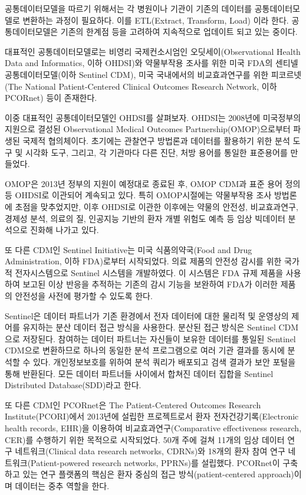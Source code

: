 \documentclass[]{book}
\begin{document}
공통데이터모델을 따르기 위해서는 각 병원이나 기관이 기존의 데이터를 공통데이터모델로 변환하는 과정이 필요하다. 이를 ETL(Extract, Transform, Load) 이라 한다. 공통데이터모델은 기존의 한계점 등을 고려하여 지속적으로 업데이트 되고 있는 중이다.

대표적인 공통데이터모델로는 비영리 국제컨소시엄인 오딧세이(Observational Health Data and Informatics, 이하 OHDSI)와 약물부작용 조사를 위한 미국 FDA의 센티넬 공통데이터모델(이하 Sentinel CDM), 미국 국내에서의 비교효과연구를 위한 피코르넷(The National Patient-Centered Clinical Outcomes Research Network, 이하 PCORnet) 등이 존재한다.

이중 대표적인 공통데이터모델인 OHDSI를 살펴보자. OHDSI는 2008년에 미국정부의 지원으로 결성된 Observational Medical Outcomes Partnership(OMOP)으로부터 파생된 국제적 협의체이다. 초기에는 관찰연구 방법론과 데이터를 활용하기 위한 분석 도구 및 시각화 도구, 그리고, 각 기관마다 다른 진단, 처방 용어를 통일한 표준용어를 만들었다.

OMOP은 2013년 정부의 지원이 예정대로 종료된 후, OMOP CDM과 표준 용어 정의 등 OHDSI로 이관되어 계속되고 있다. 특히 OMOP시절에는 약물부작용 조사 방법론에 초점을 맞추었지만, 이후 OHDSI로 이관한 이후에는 약물의 안전성, 비교효과연구, 경제성 분석, 의료의 질, 인공지능 기반의 환자 개별 위험도 예측 등 임상 빅데이터 분석으로 진화해 나가고 있다.

또 다른 CDM인 Sentinel Initiative는 미국 식품의약국(Food and Drug Administration, 이하 FDA)로부터 시작되었다. 의료 제품의 안전성 감시를 위한 국가적 전자시스템으로 Sentinel 시스템을 개발하였다. 이 시스템은 FDA 규제 제품을 사용하여 보고된 이상 반응을 추적하는 기존의 감시 기능을 보완하여 FDA가 이러한 제품의 안전성을 사전에 평가할 수 있도록 한다.

Sentinel은 데이터 파트너가 기존 환경에서 전자 데이터에 대한 물리적 및 운영상의 제어를 유지하는 분산 데이터 접근 방식을 사용한다. 분산된 접근 방식은 Sentinel CDM으로 저장된다. 참여하는 데이터 파트너는 자신들이 보유한 데이터를 통일된 Sentinel CDM으로 변환하므로 하나의 동일한 분석 프로그램으로 여러 기관 결과를 동시에 분석할 수 있다. 개인정보보호를 위하여 분석 쿼리가 배포되고 검색 결과가 보안 포털을 통해 반환된다. 모든 데이터 파트너들 사이에서 합쳐진 데이터 집합을 Sentinel Distributed Database(SDD)라고 한다.

또 다른 CDM인 PCORnet은 The Patient-Centered Outcomes Research Institute(PCORI)에서 2013년에 설립한 프로젝트로서 환자 전자건강기록(Electronic health records, EHR)을 이용하여 비교효과연구(Comparative effectiveness research, CER)를 수행하기 위한 목적으로 시작되었다. 50개 주에 걸쳐 11개의 임상 데이터 연구 네트워크(Clinical data research networks, CDRNs)와 18개의 환자 참여 연구 네트워크(Patient-powered research networks, PPRNs)를 설립했다. PCORnet이 구축하고 있는 연구 플랫폼의 핵심은 환자 중심의 접근 방식(patient-centered approach)이며 데이터는 중추 역할을 한다.
\end{document}
